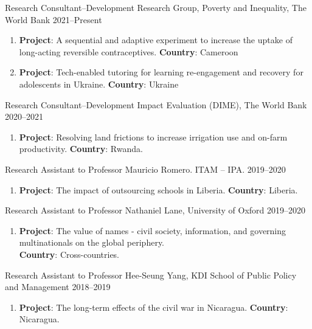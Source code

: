 \documentclass[a4paper, 10pt]{article}
\renewenvironment{itemize}{
  \begin{list}{}
    { \setlength{\itemsep}{5pt}
      \setlength{\parsep}{0pt}
      \setlength{\topsep}{0pt}
      \setlength{\leftmargin}{0em} } }{
  \end{list}}
\begin{document}
\begin{itemize}
  \item Research Consultant--Development Research Group, Poverty and Inequality, The World Bank \hfill 2021--Present 
  \begin{enumerate}[leftmargin=10pt, label={}, nosep]
    \item {\small \textbf{Project}: A sequential and adaptive experiment to increase the uptake of long-acting reversible contraceptives. \newline 
    \textbf{Country}: Cameroon} 
    \item {\small \textbf{Project}: Tech-enabled tutoring for learning re-engagement and recovery for adolescents in Ukraine. \newline 
    \textbf{Country}: Ukraine}
  \end{enumerate}
  \item Research Consultant--Development Impact Evaluation (DIME), The World Bank \hfill 2020--2021 
  \begin{enumerate}[leftmargin=10pt, label={}, nosep]  
    \item {\small \textbf{Project}: Resolving land frictions to increase irrigation use and on-farm productivity. \newline \textbf{Country}: Rwanda.}
  \end{enumerate}
  \item Research Assistant to Professor Mauricio Romero. ITAM -- IPA. \hfill 2019--2020  
  \begin{enumerate}[leftmargin=10pt, label={}, nosep]  
    \item {\small \textbf{Project}: The impact of outsourcing schools in Liberia. \newline \textbf{Country}: Liberia.}
  \end{enumerate}
  \item Research Assistant to Professor Nathaniel Lane, University of Oxford \hfill 2019--2020  
  \begin{enumerate}[leftmargin=10pt, label={}, nosep]  
    \item {\small \textbf{Project}: The value of names - civil society, information, and governing multinationals on the global periphery. \\ \textbf{Country}: Cross-countries.}
  \end{enumerate}
  \item Research Assistant to Professor Hee-Seung Yang, KDI School of Public Policy and Management \hfill 2018--2019  
  \begin{enumerate}[leftmargin=10pt, label={}, nosep]  
    \item {\small \textbf{Project}: The long-term effects of the civil war in Nicaragua. \newline \textbf{Country}: Nicaragua.}
  \end{enumerate}
\end{itemize}
\end{document}
